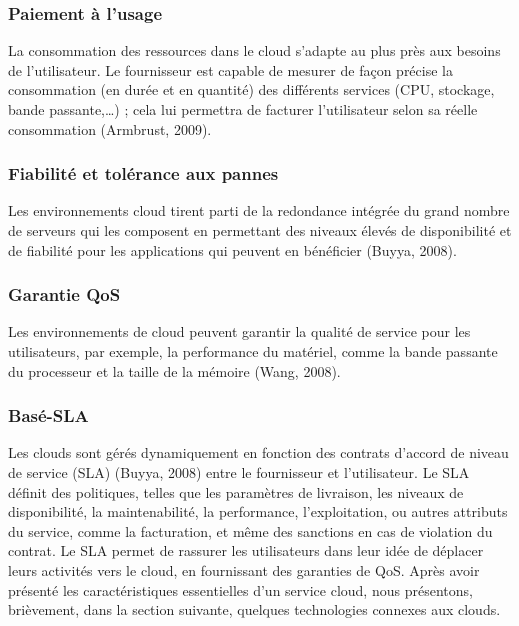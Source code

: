       \subsubsection{Paiement à l’usage}
       La consommation des ressources dans le cloud s’adapte au plus près aux besoins de l’utilisateur. Le fournisseur est capable de mesurer de façon précise la consommation (en durée et en quantité) des différents services (CPU, stockage, bande passante,…) ; cela lui permettra de facturer l’utilisateur selon sa réelle consommation (Armbrust, 2009). 
      \subsubsection{Fiabilité et tolérance aux pannes}
       Les environnements cloud tirent parti de la redondance intégrée du grand nombre de serveurs qui les composent en permettant des niveaux élevés de disponibilité et de fiabilité pour les applications qui peuvent en bénéficier (Buyya, 2008). 
      \subsubsection{Garantie QoS}
       Les environnements de cloud peuvent garantir la qualité de service pour les utilisateurs, par exemple, la performance du matériel, comme la bande passante du processeur et la taille de la mémoire (Wang, 2008). 
       
    	  \subsubsection{Basé-SLA}
    	   Les clouds sont gérés dynamiquement en fonction des contrats d’accord de niveau de service (SLA) (Buyya, 2008) entre le fournisseur et l’utilisateur. Le SLA définit des politiques, telles que les paramètres de livraison, les niveaux de disponibilité, la maintenabilité, la performance, l'exploitation, ou autres attributs du service, comme la facturation, et même des sanctions en cas de violation du contrat. Le SLA permet de rassurer les utilisateurs dans leur idée de déplacer leurs activités vers le cloud, en fournissant des garanties de QoS. 
    	Après avoir présenté les caractéristiques essentielles d’un service cloud, nous présentons, brièvement, dans la section suivante, quelques technologies connexes aux clouds.
    	
 
